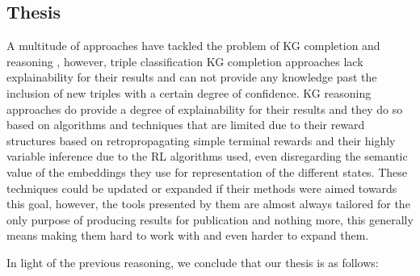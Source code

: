 
\subsection{Thesis}


A multitude of approaches have tackled the problem of KG completion \cite{} and reasoning \cite{}, however, triple classification KG completion approaches lack explainability for their results and can not provide any knowledge past the inclusion of new triples with a certain degree of confidence. KG reasoning approaches do provide a degree of explainability for their results and they do so based on algorithms and techniques that are limited due to their reward structures based on retropropagating simple terminal rewards and their highly variable inference due to the RL algorithms used, even disregarding the semantic value of the embeddings they use for representation of the different states. These techniques could be updated or expanded if their methods were aimed towards this goal, however, the tools presented by them are almost always tailored for the only purpose of producing results for publication and nothing more, this generally means making them hard to work with and even harder to expand them.

In light of the previous reasoning, we conclude that our thesis is as follows:



